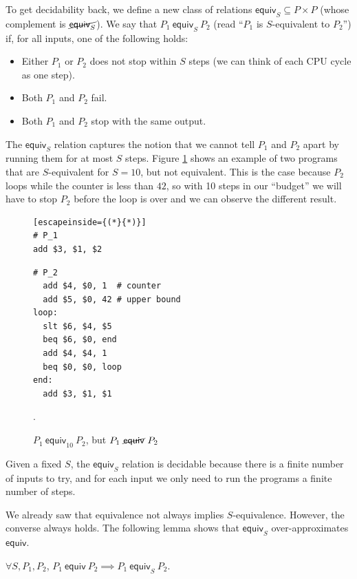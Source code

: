 \documentclass{llncs}
\newcommand{\erel}{\textsf{equiv}}
\newcommand{\merel}[1]{\textsf{equiv}_{#1}}
\newcommand{\pequiv}[2]{#1 \ \erel \ #2}
\newcommand{\pmequiv}[3]{#1 \ \merel{#3} \ #2}
\newcommand{\pnequiv}[2]{#1 \ \cancel{\erel} \ #2}
\begin{document}
To get decidability back, we define a new class of relations $\merel{S} \subseteq P \times P$ (whose complement is $\cancel{\merel{S}}$). We say that $\pmequiv{P_1}{P_2}{S}$ (read ``$P_1$ is $S$-equivalent to $P_2$'') if, for all inputs, one of the following holds:
\begin{itemize}
\item Either $P_1$ or $P_2$ does not stop within $S$ steps (we can think of each CPU cycle as one step).
\item Both $P_1$ and $P_2$ fail.
\item Both $P_1$ and $P_2$ stop with the same output. 
\end{itemize}

The $\merel{S}$ relation captures the notion that we cannot tell $P_1$ and $P_2$ apart by running them for at most $S$ steps. Figure \ref{sequiv} shows an example of two programs that are $S$-equivalent for $S=10$, but not equivalent. This is the case because $P_2$ loops while the counter is less than $42$, so with 10 steps in our ``budget'' we will have to stop $P_2$ before the loop is over and we can observe the different result.

\begin{figure}
\begin{multicols}{2}
\begin{lstlisting}[escapeinside={(*}{*)}]
# P_1
add $3, $1, $2
\end{lstlisting}
\vfill\null
\columnbreak
\begin{lstlisting}
# P_2
  add $4, $0, 1  # counter
  add $5, $0, 42 # upper bound
loop:
  slt $6, $4, $5 
  beq $6, $0, end
  add $4, $4, 1
  beq $0, $0, loop
end:
  add $3, $1, $1  
\end{lstlisting}
\end{multicols}
\caption{$\pmequiv{P_1}{P_2}{10}$, but $\pnequiv{P_1}{P_2}$}.
\label{sequiv}
\end{figure}

Given a fixed $S$, the $\merel{S}$ relation is decidable because there is a finite number of inputs to try, and for each input we only need to run the programs a finite number of steps.

We already saw that equivalence not always implies $S$-equivalence. However, the converse always holds. The following lemma shows that $\merel{S}$ over-approximates $\erel$.

\begin{lemma}
\label{overapprox}
$\forall S, P_1, P_2$, $\pequiv{P_1}{P_2} \implies \pmequiv{P_1}{P_2}{S}$.
\end{lemma}
\end{document}
